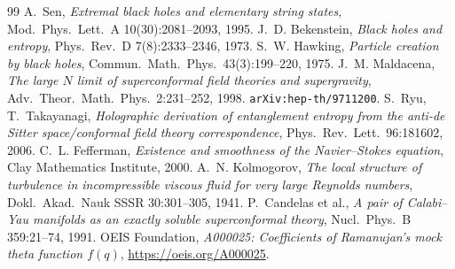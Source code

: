 \documentclass[11pt,a4paper]{article}
\theoremstyle{plain}
\theoremstyle{definition}
\begin{document}
\begin{thebibliography}{99}
 A.~Sen, \emph{Extremal black holes and elementary string states}, Mod.\ Phys.\ Lett.\ A 10(30):2081--2093, 1995.
 J.~D. Bekenstein, \emph{Black holes and entropy}, Phys.\ Rev.\ D 7(8):2333--2346, 1973.
 S.~W. Hawking, \emph{Particle creation by black holes}, Commun.\ Math.\ Phys.\ 43(3):199--220, 1975.
 J.~M. Maldacena, \emph{The large $N$ limit of superconformal field theories and supergravity}, Adv.\ Theor.\ Math.\ Phys.\ 2:231--252, 1998. \texttt{arXiv:hep-th/9711200}.
 S.~Ryu, T.~Takayanagi, \emph{Holographic derivation of entanglement entropy from the anti-de Sitter space/conformal field theory correspondence}, Phys.\ Rev.\ Lett.\ 96:181602, 2006.
 C.~L. Fefferman, \emph{Existence and smoothness of the Navier--Stokes equation}, Clay Mathematics Institute, 2000.
 A.~N. Kolmogorov, \emph{The local structure of turbulence in incompressible viscous fluid for very large Reynolds numbers}, Dokl.\ Akad.\ Nauk SSSR 30:301--305, 1941.
 P.~Candelas et al., \emph{A pair of Calabi--Yau manifolds as an exactly soluble superconformal theory}, Nucl.\ Phys.\ B 359:21--74, 1991.
 OEIS Foundation, \emph{A000025: Coefficients of Ramanujan's mock theta function $f(q)$}, \url{https://oeis.org/A000025}.
\end{thebibliography}
\end{document}
